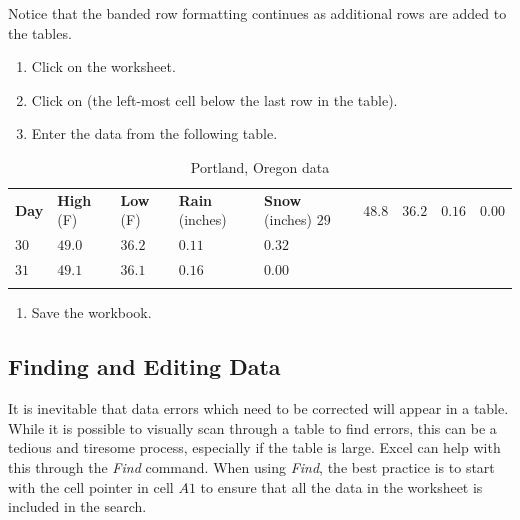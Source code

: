 Notice that the banded row formatting continues as additional rows are added to the tables.

\begin{enumerate}
	\item Click on the  worksheet.
	\item Click on  (the left-most cell below the last row in the table).
	\item Enter the data from the following table.
\end{enumerate}

\begin{table}[H]
	{\small
		\begin{longtable}{R{0.50in}R{0.50in}R{0.50in}R{0.50in}R{0.50in}} %
			\textbf{Day} & \textbf{High} (\textdegree F) & \textbf{Low} (\textdegree F) & \textbf{Rain} (inches) & \textbf{Snow} (inches) \endhead
			\hline
			$ 29 $ & $ 48.8 $ & $ 36.2 $ & $ 0.16 $ & $ 0.00 $ \\ 
			$ 30 $ & $ 49.0 $ & $ 36.2 $ & $ 0.11 $ & $ 0.32 $ \\ 
			$ 31 $ & $ 49.1 $ & $ 36.1 $ & $ 0.16 $ & $ 0.00 $ \\ 
			\caption{Portland, Oregon data}
			\label{05:tab03}
		\end{longtable}
	} %
\end{table}

\begin{enumerate}[resume]
	\item Save the  workbook.
\end{enumerate}

\subsection{Finding and Editing Data}

It is inevitable that data errors which need to be corrected will appear in a table. While it is possible to visually scan through a table to find errors, this can be a tedious and tiresome process, especially if the table is large. Excel can help with this through the \textit{Find} command. When using \textit{Find}, the best practice is to start with the cell pointer in cell $ A1 $ to ensure that all the data in the worksheet is included in the search.


